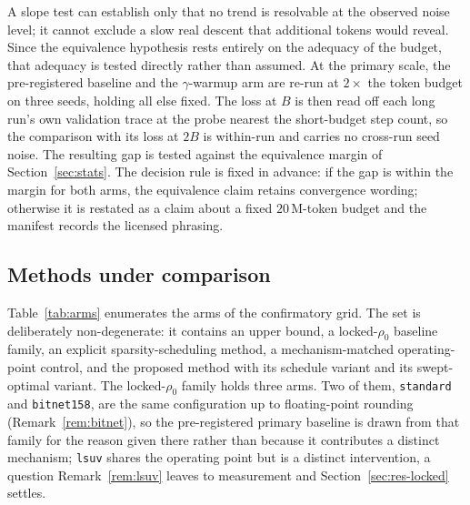 \documentclass[final,5p,times,twocolumn]{elsarticle}
\theoremstyle{remark}
\newcommand{\rhoz}{\rho_{0}}
\begin{document}
A slope test can establish only that no trend is resolvable at the
observed noise level; it cannot exclude a slow real descent that additional
tokens would reveal. Since the equivalence hypothesis rests entirely on the
adequacy of the budget, that adequacy is tested directly rather than assumed. At
the primary scale, the pre-registered baseline and the $\gamma$-warmup arm are
re-run at $2\times$ the token budget on three seeds, holding all else fixed. The loss
at $B$ is then read off each long run's own validation trace at the probe
nearest the short-budget step count, so the comparison with its loss at $2B$ is
within-run and carries no cross-run seed noise. The resulting gap is tested
against the equivalence margin of Section~\ref{sec:stats}. The decision rule is fixed in advance: if the
gap is within the margin for both arms, the equivalence claim retains
convergence wording; otherwise it is restated as a claim about a fixed
$20$\,M-token budget and the manifest records the licensed phrasing.

\subsection{Methods under comparison}
\label{sec:arms}

Table~\ref{tab:arms} enumerates the arms of the confirmatory grid. The set is
deliberately non-degenerate: it contains an upper bound, a locked-$\rhoz$
baseline family, an explicit sparsity-scheduling method, a mechanism-matched
operating-point control, and the proposed method with its schedule variant and
its swept-optimal variant. The locked-$\rhoz$ family holds three arms. Two of
them, \texttt{standard} and \texttt{bitnet158}, are the same configuration up
to floating-point rounding (Remark~\ref{rem:bitnet}), so the pre-registered
primary baseline is drawn from that family for the reason given there rather
than because it contributes a distinct mechanism; \texttt{lsuv} shares the
operating point but is a distinct intervention, a question
Remark~\ref{rem:lsuv} leaves to measurement and
Section~\ref{sec:res-locked} settles.
\end{document}

